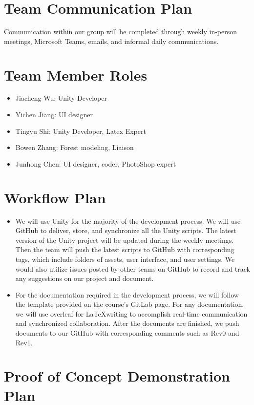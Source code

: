 \documentclass{article}
\begin{document}
\section{Team Communication Plan}
Communication within our group will be completed through weekly in-person meetings, Microsoft Teams, emails, and informal daily communications. 

\section{Team Member Roles}
\begin{itemize}
    \item Jiacheng Wu: Unity Developer
    \item Yichen Jiang: UI designer
    \item Tingyu Shi: Unity Developer, Latex Expert
    \item Bowen Zhang: Forest modeling, Liaison
    \item Junhong Chen: UI designer, coder, PhotoShop expert
\end{itemize}

\newpage

\section{Workflow Plan}
\begin{itemize}

\item We will use Unity for the majority of the development process. We will use GitHub to deliver, store, and
synchronize all the Unity scripts. The latest version of the Unity project will be updated during the weekly meetings. Then the team will push the latest scripts to GitHub with corresponding tags, which include folders of assets, user interface, and user settings. We would also utilize issues posted by other teams on GitHub to record and track any suggestions on our project and document.
 
	\item For the documentation required in the development process, we will follow the template provided on the course's GitLab page. For any documentation, we will use overleaf for \LaTeX writing to accomplish real-time communication and synchronized collaboration. After the documents are finished, we push documents to our GitHub with corresponding comments such as Rev0 and Rev1.
\end{itemize}

\section{Proof of Concept Demonstration Plan}
\end{document}
